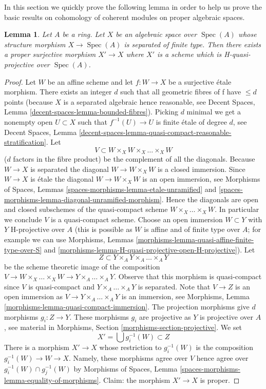 \documentclass{stacks-project}
\theoremstyle{plain}
\newtheorem{lemma}[subsection]{Lemma}
\theoremstyle{definition}
\theoremstyle{remark}
\numberwithin{equation}{subsection}
\def\Spec{\mathop{\mathrm{Spec}}}
\begin{document}
\noindent
In this section we quickly prove the following lemma in order
to help us prove the basic results on cohomology of coherent
modules on proper algebraic spaces.

\begin{lemma}
\label{lemma-weak-chow}
Let $A$ be a ring. Let $X$ be an algebraic space over $\Spec(A)$
whose structure morphism $X \to \Spec(A)$ is separated of finite type.
Then there exists a proper surjective morphism $X' \to X$
where $X'$ is a scheme which is H-quasi-projective over $\Spec(A)$.
\end{lemma}

\begin{proof}
Let $W$ be an affine scheme and let $f : W \to X$ be a surjective
\'etale morphism. There exists an integer $d$ such that all geometric
fibres of f have $\leq d$ points (because $X$ is a separated algebraic
hence reasonable, see
Decent Spaces, Lemma \ref{decent-spaces-lemma-bounded-fibres}).
Picking $d$ minimal we get a nonempty open $U \subset X$ such that
$f^{-1}(U) \to U$ is finite \'etale of degree $d$, see
Decent Spaces, Lemma
\ref{decent-spaces-lemma-quasi-compact-reasonable-stratification}.
Let
$$
V \subset W \times_X W \times_X \ldots \times_X W
$$
($d$ factors in the fibre product) be the complement of all the diagonals.
Because $W \to X$ is separated the diagonal $W \to W \times_X W$ is a
closed immersion. Since $W \to X$ is \'etale the diagonal
$W \to W \times_X W$ is an open immersion, see
Morphisms of Spaces, Lemmas
\ref{spaces-morphisms-lemma-etale-unramified} and
\ref{spaces-morphisms-lemma-diagonal-unramified-morphism}.
Hence the diagonals are open and closed subschemes
of the quasi-compact scheme $W \times_X \ldots \times_X W$.
In particular we conclude $V$ is a quasi-compact scheme.
Choose an open immersion $W \subset Y$ with $Y$ H-projective over
$A$ (this is possible as $W$ is affine and of finite type over $A$;
for example we can use
Morphisms, Lemmas
\ref{morphisms-lemma-quasi-affine-finite-type-over-S} and
\ref{morphisms-lemma-H-quasi-projective-open-H-projective}).
Let
$$
Z \subset Y \times_A Y \times_A \ldots \times_A Y
$$
be the scheme theoretic image of the composition
$V \to W \times_X \ldots \times_X W \to Y \times_A \ldots \times_A Y$.
Observe that this morphism is quasi-compact since $V$ is quasi-compact
and $Y \times_A \ldots \times_A Y$ is separated.
Note that $V \to Z$ is an open immersion as
$V \to Y \times_A \ldots \times_A Y$ is an immersion, see
Morphisms, Lemma \ref{morphisms-lemma-quasi-compact-immersion}.
The projection morphisms give $d$ morphisms $g_i : Z \to Y$.
These morphisms $g_i$ are projective as $Y$ is projective over $A$, see
material in Morphisms, Section \ref{morphisms-section-projective}.
We set
$$
X' = \bigcup g_i^{-1}(W) \subset Z
$$
There is a morphism $X' \to X$ whose restriction to $g_i^{-1}(W)$ is
the composition $g_i^{-1}(W) \to W \to X$.
Namely, these morphisms agree over $V$ hence agree over
$g_i^{-1}(W) \cap g_j^{-1}(W)$ by
Morphisms of Spaces, Lemma \ref{spaces-morphisms-lemma-equality-of-morphisms}.
Claim: the morphism $X' \to X$ is proper.


\end{proof}
\end{document}
